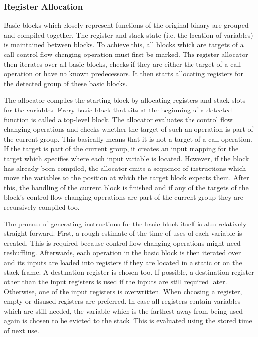 \documentclass[course=eragp]{aspdoc}
\begin{document}
\subsubsection{Register Allocation}\label{reg_alloc}
Basic blocks which closely represent functions of the original binary are grouped and compiled
together. The register and stack state (i.e. the location of variables) is maintained between blocks.
To achieve this, all blocks which are targets of a call control flow changing operation must first
be marked. The register allocator then iterates over
all basic blocks, checks if they are either the target of a call operation or have no known predecessors.
It then starts allocating registers for the detected group of these basic blocks.
\par

The allocator compiles the starting block by allocating registers and stack slots for the
variables. Every basic block that sits at the beginning of a detected function is called a top-level
block. The allocator evaluates the control flow changing operations and checks whether the target of such an operation
is part of the current group.
This basically means that it is not a target of a call operation. If the target is part of the
current group, it creates an input mapping for the target which specifies where each input variable
is located. However, if the block has already been compiled,
the allocator emits a sequence of instructions which move the variables to the position at which the target block expects them.
After this, the handling of the current block is finished and if any of the targets of the block's
control flow changing operations are part of the current group they are recursively compiled too.

\par

The process of generating instructions for the basic block itself is also relatively straight forward. First,
a rough estimate of the time-of-uses of
each variable is created. This is required because control flow changing operations might need
reshuffling.
Afterwards, each operation in the basic block is then iterated over and its inputs are loaded into
registers if they are located in a static or on the stack frame. A destination register is
chosen too.
If possible, a destination register other than the input registers is used if the inputs
are still required later. Otherwise, one of the input registers is overwritten.
When choosing a register, empty or disused registers are preferred. In case all registers contain variables which
are still needed,
the variable which is the farthest away from being used again is chosen to be evicted to the stack.
This is evaluated using the stored time of next use.
\end{document}
